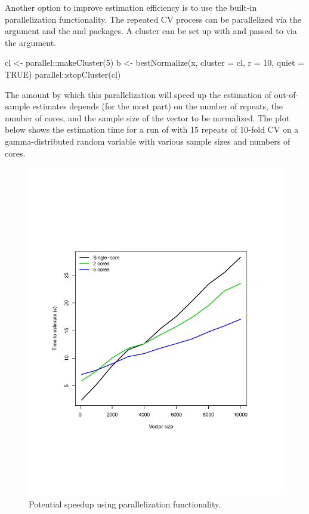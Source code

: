 Another option to improve estimation efficiency is to use the built-in
parallelization functionality. The repeated CV process can be
parallelized via the  argument and the 
and  \citep{doRNG} packages. A cluster can be set up with
 and passed to  via the
 argument.

\begin{Schunk}
\begin{Sinput}
cl <- parallel::makeCluster(5)
b <- bestNormalize(x, cluster = cl, r = 10, quiet = TRUE)
parallel::stopCluster(cl)
\end{Sinput}
\end{Schunk}

The amount by which this parallelization will speed up the estimation of
out-of-sample estimates depends (for the most part) on the number of
repeats, the number of cores, and the sample size of the vector to be
normalized. The plot below shows the estimation time for a run of
 with 15 repeats of 10-fold CV on a
gamma-distributed random variable with various sample sizes and numbers
of cores.

\begin{Schunk}
\begin{figure}

{\centering \includegraphics[width=1\linewidth]{figs/parallel_timings} 

}

\caption[Potential speedup using parallelization functionality]{Potential speedup using parallelization functionality.}\label{fig:parallel_timings}
\end{figure}
\end{Schunk}

